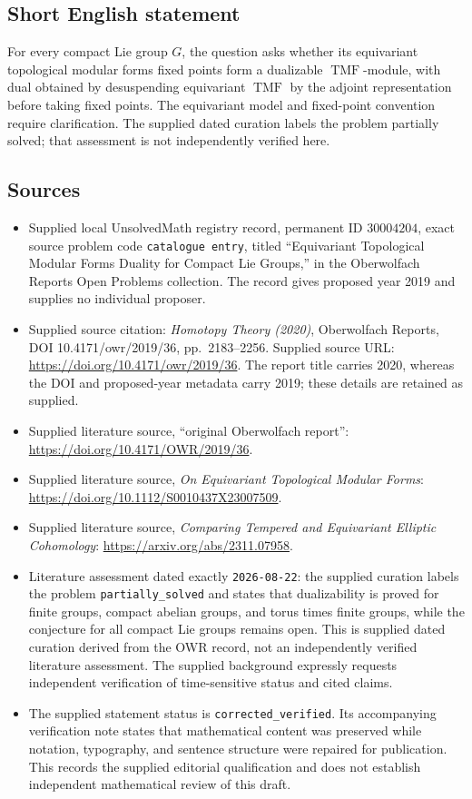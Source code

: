 \documentclass[11pt]{article}
\begin{document}
\subsection{Short English statement}
For every compact Lie group \(G\), the question asks whether its equivariant topological modular forms fixed points form a dualizable \(\operatorname{TMF}\)-module, with dual obtained by desuspending equivariant \(\operatorname{TMF}\) by the adjoint representation before taking fixed points. The equivariant model and fixed-point convention require clarification. The supplied dated curation labels the problem partially solved; that assessment is not independently verified here.
\subsection{Sources}
\begin{itemize}
\item Supplied local UnsolvedMath registry record, permanent ID \(30004204\), exact source problem code \texttt{catalogue entry}, titled ``Equivariant Topological Modular Forms Duality for Compact Lie Groups,'' in the Oberwolfach Reports Open Problems collection. The record gives proposed year 2019 and supplies no individual proposer.
\item Supplied source citation: \emph{Homotopy Theory (2020)}, Oberwolfach Reports, DOI 10.4171/owr/2019/36, pp.\ 2183--2256. Supplied source URL: \url{https://doi.org/10.4171/owr/2019/36}. The report title carries 2020, whereas the DOI and proposed-year metadata carry 2019; these details are retained as supplied.
\item Supplied literature source, ``original Oberwolfach report'': \url{https://doi.org/10.4171/OWR/2019/36}.
\item Supplied literature source, \emph{On Equivariant Topological Modular Forms}: \url{https://doi.org/10.1112/S0010437X23007509}.
\item Supplied literature source, \emph{Comparing Tempered and Equivariant Elliptic Cohomology}: \url{https://arxiv.org/abs/2311.07958}.
\item Literature assessment dated exactly \texttt{2026-08-22}: the supplied curation labels the problem \texttt{partially\_solved} and states that dualizability is proved for finite groups, compact abelian groups, and torus times finite groups, while the conjecture for all compact Lie groups remains open. This is supplied dated curation derived from the OWR record, not an independently verified literature assessment. The supplied background expressly requests independent verification of time-sensitive status and cited claims.
\item The supplied statement status is \texttt{corrected\_verified}. Its accompanying verification note states that mathematical content was preserved while notation, typography, and sentence structure were repaired for publication. This records the supplied editorial qualification and does not establish independent mathematical review of this draft.
\end{itemize}
\end{document}
